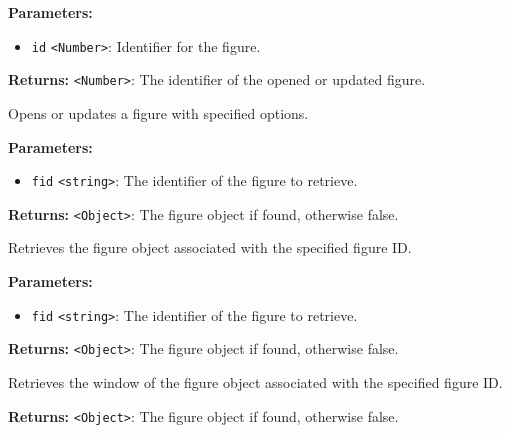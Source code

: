 \documentclass[12pt,a4paper]{article}
\begin{document}
\noindent \textbf{Parameters:}
\begin{itemize}
  \item \texttt{id} \texttt{<Number>}: Identifier for the figure.
\end{itemize}

\noindent \textbf{Returns:} \texttt{<Number>}: The identifier of the opened or updated figure.

\noindent Opens or updates a figure with specified options.

\vspace{5mm}
\noindent {}


\noindent \textbf{Parameters:}
\begin{itemize}
  \item \texttt{fid} \texttt{<string>}: The identifier of the figure to retrieve.
\end{itemize}

\noindent \textbf{Returns:} \texttt{<Object>}: The figure object if found, otherwise \textasciigrave{}false\textasciigrave{}.

\noindent Retrieves the figure object associated with the specified figure ID.

\vspace{5mm}
\noindent {}


\noindent \textbf{Parameters:}
\begin{itemize}
  \item \texttt{fid} \texttt{<string>}: The identifier of the figure to retrieve.
\end{itemize}

\noindent \textbf{Returns:} \texttt{<Object>}: The figure object if found, otherwise \textasciigrave{}false\textasciigrave{}.

\noindent Retrieves the window of the figure object associated with the specified figure ID.

\vspace{5mm}
\noindent {}


\noindent \textbf{Returns:} \texttt{<Object>}: The figure object if found, otherwise \textasciigrave{}false\textasciigrave{}.
\end{document}
